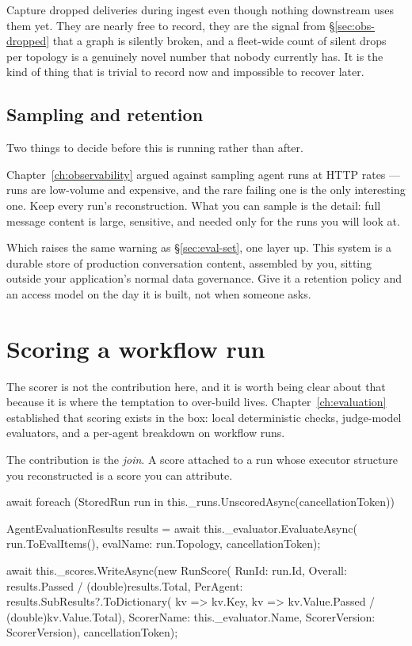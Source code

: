 \begin{note}
Capture dropped deliveries during ingest even though nothing downstream uses
them yet. They are nearly free to record, they are the signal from
\S\ref{sec:obs-dropped} that a graph is silently broken, and a fleet-wide count
of silent drops per topology is a genuinely novel number that nobody currently
has. It is the kind of thing that is trivial to record now and impossible to
recover later.
\end{note}

\subsection{Sampling and retention}

Two things to decide before this is running rather than after.

Chapter~\ref{ch:observability} argued against sampling agent runs at HTTP rates
--- runs are low-volume and expensive, and the rare failing one is the only
interesting one. Keep every run's reconstruction. What you can sample is the
detail: full message content is large, sensitive, and needed only for the runs
you will look at.

Which raises the same warning as \S\ref{sec:eval-set}, one layer up. This system
is a durable store of production conversation content, assembled by you, sitting
outside your application's normal data governance. Give it a retention policy and
an access model on the day it is built, not when someone asks.

\section{Scoring a workflow run}
\label{sec:cap-scoring}

The scorer is not the contribution here, and it is worth being clear about that
because it is where the temptation to over-build lives.
Chapter~\ref{ch:evaluation} established that scoring exists in the box: local
deterministic checks, judge-model evaluators, and a per-agent breakdown on
workflow runs.

The contribution is the \emph{join}. A score attached to a run whose executor
structure you reconstructed is a score you can attribute.

\begin{csharp}[caption={Scoring stored runs, out of band}, label={lst:cap-score}]
await foreach (StoredRun run in this._runs.UnscoredAsync(cancellationToken))
{
    AgentEvaluationResults results = await this._evaluator.EvaluateAsync(
        run.ToEvalItems(), evalName: run.Topology, cancellationToken);

    await this._scores.WriteAsync(new RunScore(
        RunId:      run.Id,
        Overall:    results.Passed / (double)results.Total,
        PerAgent:   results.SubResults?.ToDictionary(
                        kv => kv.Key,
                        kv => kv.Value.Passed / (double)kv.Value.Total),
        ScorerName: this._evaluator.Name,
        ScorerVersion: ScorerVersion), cancellationToken);
}
\end{csharp}


